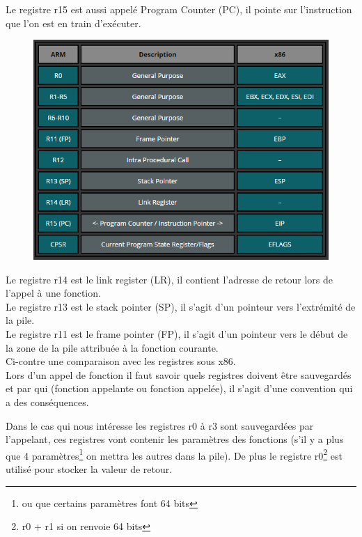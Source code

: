 \documentclass[a4paper,10pt]{article} %
\begin{document}
Le registre r15 est aussi appelé Program Counter (PC), il pointe sur l'instruction que l'on est en train d’exécuter.\\
\begin{figure}
\includegraphics[scale=0.55]{assets/registers.png}
\end{figure}

Le registre r14 est le link register (LR), il contient l'adresse de retour lors de l'appel à une fonction.\\

Le registre r13 est le stack pointer (SP), il s'agit d'un pointeur vers l'extrémité de la pile.\\

Le registre r11 est le frame pointer (FP), il s'agit d'un pointeur vers le début de la zone de la pile attribuée à la fonction courante.\\

Ci-contre une comparaison avec les registres sous x86.\\

Lors d'un appel de fonction il faut savoir quels registres doivent être sauvegardés et par qui (fonction appelante ou fonction appelée), il s'agit d'une convention qui a des conséquences.

Dans le cas qui nous intéresse les registres r0 à r3 sont sauvegardées par l'appelant, ces registres vont contenir les paramètres des fonctions (s'il y a plus que 4 paramètres\footnote{ou que certains paramètres font 64 bits} on mettra les autres dans la pile). De plus le registre r0\footnote{r0 + r1 si on renvoie 64 bits} est utilisé pour stocker la valeur de retour.\\
\end{document}
